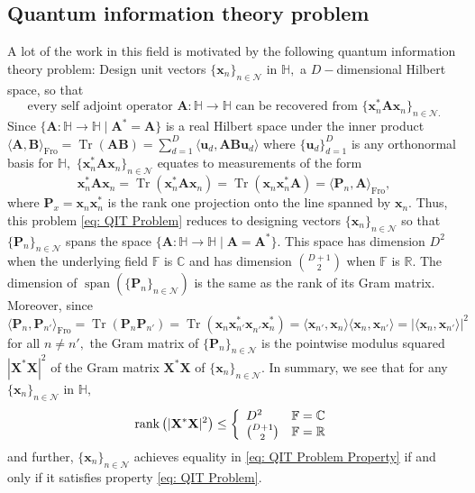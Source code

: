 \documentclass[3p,11pt]{elsarticle}
\newcommand{\bbC}{\mathbb{C}}
\newcommand{\bbF}{\mathbb{F}}
\newcommand{\bbH}{\mathbb{H}}
\newcommand{\bbR}{\mathbb{R}}
\newcommand{\bfA}{\mathbf{A}}
\newcommand{\bfB}{\mathbf{B}}
\newcommand{\bfP}{\mathbf{P}}
\newcommand{\bfu}{\mathbf{u}}
\newcommand{\bfx}{\mathbf{x}}
\newcommand{\bfX}{\mathbf{X}}
\newcommand{\calN}{\mathcal{N}}
\newcommand{\Tr}{\operatorname{Tr}}
\newcommand{\rank}{\operatorname{rank}}
\newcommand{\Span}{\operatorname{span}}
\newcommand{\Fro}{\mathrm{Fro}}
\newcommand{\abs}[1]{|{#1}|}
\newcommand{\ip}[2]{\langle{#1},{#2}\rangle}
\theoremstyle{definition}
\begin{document}
\subsection{Quantum information theory problem}

A lot of the work in this field is motivated by the following quantum information theory problem: Design unit vectors $\{\bfx_n\}_{n\in\calN}$ in $\bbH,$ a $D-$dimensional Hilbert space, so that 
\begin{equation}
\label{eq: QIT Problem}
    \text{every self adjoint operator }\bfA:\bbH\to\bbH \text{ can be recovered from }\{\bfx_n^*\bfA\bfx_n^{}\}_{n\in\calN.}
\end{equation}
Since $\{\bfA:\bbH\to\bbH\mid\bfA^*=\bfA\}$ is a real Hilbert space under the inner product $\ip{\bfA}{\bfB}_\Fro=\Tr(\bfA\bfB)=\sum_{d=1}^D\ip{\bfu_d}{\bfA\bfB\bfu_d}$ where $\{\bfu_d\}_{d=1}^D$ is any orthonormal basis for $\bbH,$ $\{\bfx_n^*\bfA\bfx_n^{}\}_{n\in\calN}$ equates to measurements of the form 
\begin{equation*}
    \bfx_n^*\bfA\bfx_n^{}=\Tr(\bfx_n^*\bfA\bfx_n^{})=\Tr(\bfx_n^{}\bfx_n^*\bfA)=\ip{\bfP_n}{\bfA}_\Fro,
\end{equation*}
where $\bfP_x=\bfx_n^{}\bfx_n^*$ is the rank one projection onto the line spanned by $\bfx_n.$ Thus, this problem \eqref{eq: QIT Problem} reduces to designing vectors $\{\bfx_n\}_{n\in\calN}$ so that $\{\bfP_n\}_{n\in\calN}$ spans the space $\{\bfA:\bbH\to\bbH\mid\bfA=\bfA^*\}.$ This space has dimension $D^2$ when the underlying field $\bbF$ is $\bbC$ and has dimension $\binom{D+1}{2}$ when $\bbF$ is $\bbR.$ The dimension of $\Span(\{\bfP_n\}_{n\in\calN})$ is the same as the rank of its Gram matrix. Moreover, since
\begin{equation}
\label{eq: IP of P_n}
    \ip{\bfP_n}{\bfP_{n'}}_\Fro=\Tr(\bfP_n\bfP_{n'})=\Tr(\bfx_n^{}\bfx_{n'}^*\bfx_{n'}^{}\bfx_{n}^*)=\ip{\bfx_{n'}}{\bfx_n}\ip{\bfx_n}{\bfx_{n'}}=\abs{\ip{\bfx_n}{\bfx_{n'}}}^2
\end{equation}
for all $n\not=n',$ the Gram matrix of $\{\bfP_n\}_{n\in\calN}$ is the pointwise modulus squared $\abs{\bfX^*\bfX}^2$ of the Gram matrix $\bfX^*\bfX$ of $\{\bfx_n\}_{n\in\calN}.$ In summary, we see that for any $\{\bfx_n\}_{n\in\calN}$ in $\bbH,$
\begin{equation}
\label{eq: QIT Problem Property}
\rank\left(\abs{\bfX^*\bfX}^2\right)\leq\left\{\begin{array}{lc}
D^2 & \bbF=\bbC \\
\tbinom{D+1}{2} & \bbF=\bbR
\end{array}\right.
\end{equation}
and further, $\{\bfx_n\}_{n\in\calN}$ achieves equality in \eqref{eq: QIT Problem Property} if and only if it satisfies property \eqref{eq: QIT Problem}. 
\end{document}
